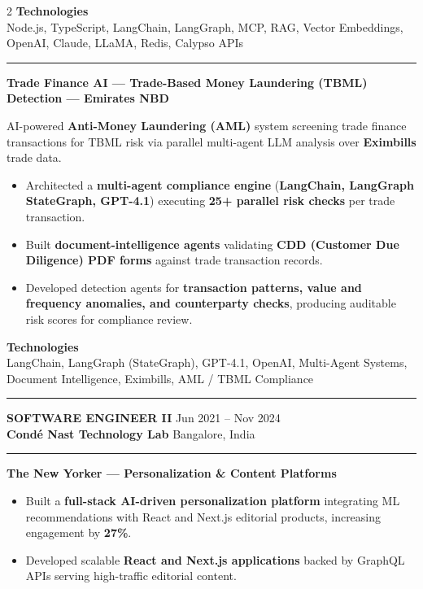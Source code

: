 \documentclass[10pt,a4paper]{article}
\newcommand{\blockdivider}{\vspace{0pt}\color{rulecolor}\rule{\linewidth}{0.5pt}\color{primary}\vspace{4pt}}
\newcommand{\roleheader}[4]{%
  \noindent
  \textbf{\MakeUppercase{#3}}%
  \hfill
  \textcolor{secondary}{#4}\\[0pt]

  \noindent
  \textbf{#1}%
  \hfill
  \textcolor{secondary}{#2}\\[0pt]
}
\newcommand{\roledivider}{%
  \vspace{-1pt}%
  {\color{rulecolor}\rule{\linewidth}{0.5pt}}%
  \vspace{2pt}%
}
\newcommand{\projecttitle}[1]{\textbf{#1}\par\vspace{2pt}}
\begin{document}
\begin{paracol}{2}
\textbf{Technologies}\\
Node.js, TypeScript, LangChain, LangGraph, MCP, RAG, Vector Embeddings, OpenAI, Claude, LLaMA, Redis, Calypso APIs

\blockdivider

\projecttitle{Trade Finance AI — Trade-Based Money Laundering (TBML) Detection — Emirates NBD}

AI-powered \textbf{Anti-Money Laundering (AML)} system screening trade finance transactions for TBML risk via parallel multi-agent LLM analysis over \textbf{Eximbills} trade data.

\begin{itemize}

\item Architected a \textbf{multi-agent compliance engine} (\textbf{LangChain, LangGraph StateGraph, GPT-4.1}) executing \textbf{25+ parallel risk checks} per trade transaction.

\item Built \textbf{document-intelligence agents} validating \textbf{CDD (Customer Due Diligence) PDF forms} against trade transaction records.

\item Developed detection agents for \textbf{transaction patterns, value and frequency anomalies, and counterparty checks}, producing auditable risk scores for compliance review.

\end{itemize}

\textbf{Technologies}\\
LangChain, LangGraph (StateGraph), GPT-4.1, OpenAI, Multi-Agent Systems, Document Intelligence, Eximbills, AML / TBML Compliance

\blockdivider


\roleheader{Cond\'e Nast Technology Lab}{Bangalore, India}{Software Engineer II}{Jun 2021 -- Nov 2024}
\roledivider
\projecttitle{ The New Yorker — Personalization \& Content Platforms}

\begin{itemize}

\item Built a \textbf{full-stack AI-driven personalization platform} integrating ML recommendations with React and Next.js editorial products, increasing engagement by \textbf{27\%}.

\item Developed scalable \textbf{React and Next.js applications} backed by GraphQL APIs serving high-traffic editorial content.


\end{itemize}
\end{paracol}
\end{document}
